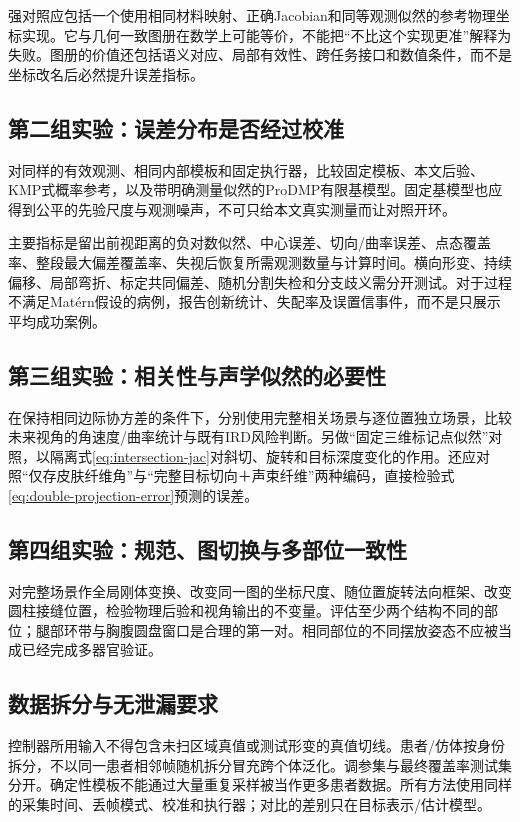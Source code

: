 \documentclass[UTF8,11pt,a4paper,fontset=fandol]{ctexart}
\numberwithin{equation}{section}
\theoremstyle{plain}
\theoremstyle{definition}
\theoremstyle{remark}
\begin{document}
强对照应包括一个使用相同材料映射、正确Jacobian和同等观测似然的参考物理坐标实现。它与几何一致图册在数学上可能等价，不能把“不比这个实现更准”解释为失败。图册的价值还包括语义对应、局部有效性、跨任务接口和数值条件，而不是坐标改名后必然提升误差指标。

\subsection{第二组实验：误差分布是否经过校准}
对同样的有效观测、相同内部模板和固定执行器，比较固定模板、本文后验、KMP式概率参考，以及带明确测量似然的ProDMP有限基模型。固定基模型也应得到公平的先验尺度与观测噪声，不可只给本文真实测量而让对照开环。

主要指标是留出前视距离的负对数似然、中心误差、切向/曲率误差、点态覆盖率、整段最大偏差覆盖率、失视后恢复所需观测数量与计算时间。横向形变、持续偏移、局部弯折、标定共同偏差、随机分割失检和分支歧义需分开测试。对于过程不满足Mat\'ern假设的病例，报告创新统计、失配率及误置信事件，而不是只展示平均成功案例。

\subsection{第三组实验：相关性与声学似然的必要性}
在保持相同边际协方差的条件下，分别使用完整相关场景与逐位置独立场景，比较未来视角的角速度/曲率统计与既有IRD风险判断。另做“固定三维标记点似然”对照，以隔离式\eqref{eq:intersection-jac}对斜切、旋转和目标深度变化的作用。还应对照“仅存皮肤纤维角”与“完整目标切向＋声束纤维”两种编码，直接检验式\eqref{eq:double-projection-error}预测的误差。

\subsection{第四组实验：规范、图切换与多部位一致性}
对完整场景作全局刚体变换、改变同一图的坐标尺度、随位置旋转法向框架、改变圆柱接缝位置，检验物理后验和视角输出的不变量。评估至少两个结构不同的部位；腿部环带与胸腹圆盘窗口是合理的第一对。相同部位的不同摆放姿态不应被当成已经完成多器官验证。

\subsection{数据拆分与无泄漏要求}
控制器所用输入不得包含未扫区域真值或测试形变的真值切线。患者/仿体按身份拆分，不以同一患者相邻帧随机拆分冒充跨个体泛化。调参集与最终覆盖率测试集分开。确定性模板不能通过大量重复采样被当作更多患者数据。所有方法使用同样的采集时间、丢帧模式、校准和执行器；对比的差别只在目标表示/估计模型。
\end{document}

